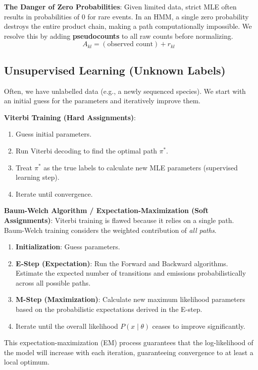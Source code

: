 \sta \textbf{The Danger of Zero Probabilities}: Given limited data, strict MLE often results in probabilities of 0 for rare events. In an HMM, a single zero probability destroys the entire product chain, making a path computationally impossible. We resolve this by adding \textbf{pseudocounts} to all raw counts before normalizing. 
\[ A_{kl} = (\text{observed count}) + r_{kl} \]

\subsection{Unsupervised Learning (Unknown Labels)}
Often, we have unlabelled data (e.g., a newly sequenced species). We start with an initial guess for the parameters and iteratively improve them.

\textbf{Viterbi Training (Hard Assignments)}:
\begin{enumerate}
    \item Guess initial parameters.
    \item Run Viterbi decoding to find the optimal path $\pi^*$.
    \item Treat $\pi^*$ as the true labels to calculate new MLE parameters (supervised learning step).
    \item Iterate until convergence.
\end{enumerate}

\textbf{Baum-Welch Algorithm / Expectation-Maximization (Soft Assignments)}:
Viterbi training is flawed because it relies on a single path. Baum-Welch training considers the weighted contribution of \textit{all paths}.
\begin{enumerate}
    \item \textbf{Initialization}: Guess parameters.
    \item \textbf{E-Step (Expectation)}: Run the Forward and Backward algorithms. Estimate the expected number of transitions and emissions probabilistically across all possible paths.
    \item \textbf{M-Step (Maximization)}: Calculate new maximum likelihood parameters based on the probabilistic expectations derived in the E-step.
    \item Iterate until the overall likelihood $P(x \mid \theta)$ ceases to improve significantly.
\end{enumerate}
This expectation-maximization (EM) process guarantees that the log-likelihood of the model will increase with each iteration, guaranteeing convergence to at least a local optimum.

